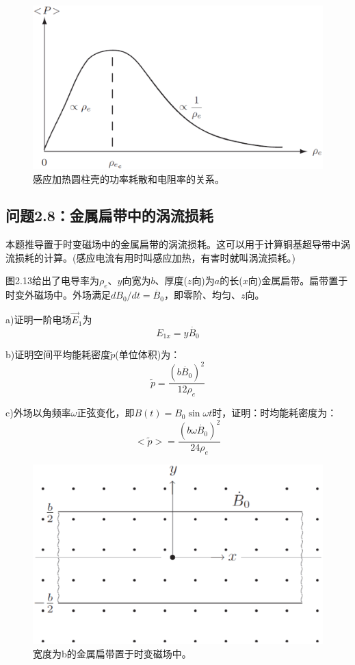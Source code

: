 \begin{figure}[htbp]
  \centering
 \includegraphics[scale=0.4]{chpt2/figs/fig2.12.eps}
  \caption{感应加热圆柱壳的功率耗散和电阻率的关系。}
\end{figure}




\subsection{问题2.8：金属扁带中的涡流损耗}
本题推导置于时变磁场中的金属扁带的涡流损耗。这可以用于计算铜基超导带中涡流损耗的计算。(感应电流有用时叫感应加热，有害时就叫涡流损耗。)

图2.13给出了电导率为$\rho_e$、$y$向宽为$b$、厚度($z$向)为$a$的长($x$向)金属扁带。扁带置于时变外磁场中。外场满足$dB_0/dt=\dot{B_0}$，即零阶、均匀、$z$向。

a)证明一阶电场$\vec{E}_1$为
\begin{equation}
E_{1x}=y\dot{B_0}
\end{equation}

b)证明空间平均能耗密度$\tilde{p}$(单位体积)为：
\begin{equation}
\tilde{p}=\frac{(b\dot{B_0})^2}{12\rho_e}
\end{equation}

c)外场以角频率$\omega$正弦变化，即$B(t)=B_0 \sin\omega t$时，证明：时均能耗密度为：
\begin{equation}
<\tilde{p}>=\frac{(b\omega\dot{B_0})^2}{24\rho_e}
\end{equation}

\begin{figure}[htbp]
  \centering
 \includegraphics[scale=0.4]{chpt2/figs/fig2.13.eps}
  \caption{宽度为b的金属扁带置于时变磁场中。}
\end{figure}

